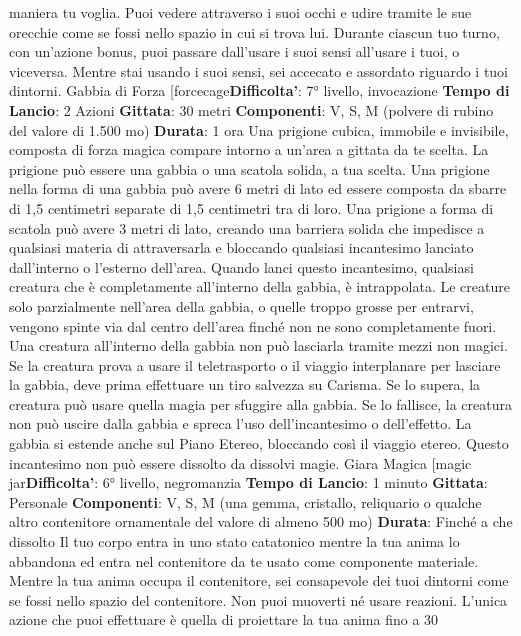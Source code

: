 \begin{multicols}{2}
maniera tu voglia.
Puoi vedere attraverso i suoi occhi e udire tramite le
sue orecchie come se fossi nello spazio in cui si trova
lui. Durante ciascun tuo turno, con un’azione bonus,
puoi passare dall’usare i suoi sensi all’usare i tuoi, o
viceversa. Mentre stai usando i suoi sensi, sei accecato
e assordato riguardo i tuoi dintorni.
Gabbia di Forza
[forcecage\textbf{Difficolta'}:
7° livello, invocazione
\textbf{Tempo di Lancio}: 2 Azioni
\textbf{Gittata}: 30 metri
\textbf{Componenti}: V, S, M (polvere di rubino del valore di
1.500 mo)
\textbf{Durata}: 1 ora
Una prigione cubica, immobile e invisibile, composta di
forza magica compare intorno a un’area a gittata da te
scelta. La prigione può essere una gabbia o una scatola
solida, a tua scelta.
Una prigione nella forma di una gabbia può avere 6
metri di lato ed essere composta da sbarre di 1,5
centimetri separate di 1,5 centimetri tra di loro.
Una prigione a forma di scatola può avere 3 metri di
lato, creando una barriera solida che impedisce a
qualsiasi materia di attraversarla e bloccando qualsiasi
incantesimo lanciato dall’interno o l’esterno dell’area.
Quando lanci questo incantesimo, qualsiasi creatura
che è completamente all’interno della gabbia, è
intrappolata. Le creature solo parzialmente nell’area
della gabbia, o quelle troppo grosse per entrarvi,
vengono spinte via dal centro dell’area finché non ne
sono completamente fuori.
Una creatura all’interno della gabbia non può lasciarla
tramite mezzi non magici. Se la creatura prova a usare
il teletrasporto o il viaggio interplanare per lasciare la
gabbia, deve prima effettuare un tiro salvezza su
Carisma. Se lo supera, la creatura può usare quella
magia per sfuggire alla gabbia. Se lo fallisce, la
creatura non può uscire dalla gabbia e spreca l’uso
dell’incantesimo o dell’effetto. La gabbia si estende
anche sul Piano Etereo, bloccando così il viaggio
etereo.
Questo incantesimo non può essere dissolto da dissolvi
magie.
Giara Magica
[magic jar\textbf{Difficolta'}:
6° livello, negromanzia
\textbf{Tempo di Lancio}: 1 minuto
\textbf{Gittata}: Personale
\textbf{Componenti}: V, S, M (una gemma, cristallo, reliquario
o qualche altro contenitore ornamentale del valore di
almeno 500 mo)
\textbf{Durata}: Finché a che dissolto
Il tuo corpo entra in uno stato catatonico mentre la tua
anima lo abbandona ed entra nel contenitore da te
usato come componente materiale. Mentre la tua anima
occupa il contenitore, sei consapevole dei tuoi dintorni
come se fossi nello spazio del contenitore. Non puoi
muoverti né usare reazioni. L’unica azione che puoi
effettuare è quella di proiettare la tua anima fino a 30

\end{multicols}
